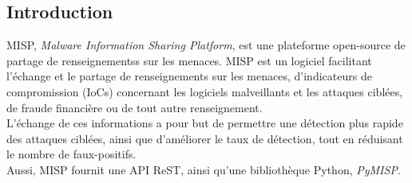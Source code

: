 \subsection{Introduction}

MISP, \textit{Malware Information Sharing Platform}, est une plateforme open-source de partage de renseignementss sur les menaces. MISP est un logiciel facilitant l'échange et le partage de renseignements sur les menaces, d'indicateurs de compromission (IoCs) concernant les logiciels malveillants et les attaques ciblées, de fraude financière ou de tout autre renseignement. \\

L'échange de ces informations a pour but de permettre une détection plus rapide des attaques ciblées, ainsi que d'améliorer le taux de détection, tout en réduisant le nombre de faux-positifs. \\

Aussi, MISP fournit une API ReST, ainsi qu'une bibliothèque Python, \textit{PyMISP}.